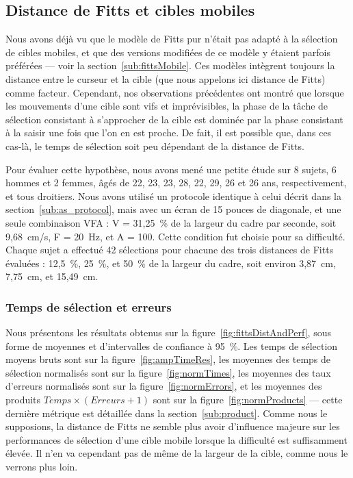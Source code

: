	\subsection{Distance de Fitts et cibles mobiles}
	\label{sub:fittsDistance}
	Nous avons déjà vu que le modèle de Fitts pur n'était pas adapté à la sélection de cibles mobiles, et que des versions modifiées de ce modèle y étaient parfois préférées --- voir la section~\ref{sub:fittsMobile}. Ces modèles intègrent toujours la distance entre le curseur et la cible (que nous appelons ici distance de Fitts) comme facteur. Cependant, nos observations précédentes ont montré que lorsque les mouvements d'une cible sont vifs et imprévisibles, la phase de la tâche de sélection consistant à s'approcher de la cible est dominée par la phase consistant à la saisir une fois que l'on en est proche. De fait, il est possible que, dans ces cas-là, le temps de sélection soit peu dépendant de la distance de Fitts.
	
	Pour évaluer cette hypothèse, nous avons mené une petite étude sur 8 sujets, 6 hommes et 2 femmes, âgés de 22, 23, 23, 28, 22, 29, 26 et 26 ans, respectivement, et tous droitiers. Nous avons utilisé un protocole identique à celui décrit dans la section~\ref{sub:as_protocol}, mais avec un écran de 15 pouces de diagonale, et une seule combinaison VFA : V = 31,25~\%{} de la largeur du cadre par seconde, soit 9,68~cm/s, F = 20~Hz, et A = 100\textdegree{}. Cette condition fut choisie pour sa difficulté. Chaque sujet a effectué 42 sélections pour chacune des trois distances de Fitts évaluées : 12,5~\%{}, 25~\%{}, et 50~\%{} de la largeur du cadre, soit environ 3,87~cm, 7,75~cm, et 15,49~cm.
	
	\subsubsection{Temps de sélection et erreurs}
	Nous présentons les résultats obtenus sur la figure~\ref{fig:fittsDistAndPerf}, sous forme de moyennes et d'intervalles de confiance à 95~\%{}. Les temps de sélection moyens bruts sont sur la figure~\ref{fig:ampTimeRes}, les moyennes des temps de sélection normalisés sont sur la figure~\ref{fig:normTimes}, les moyennes des taux d'erreurs normalisés sont sur la figure~\ref{fig:normErrors}, et les moyennes des produits $Temps\times(Erreurs+1)$ sont sur la figure~\ref{fig:normProducts} --- cette dernière métrique est détaillée dans la section~\ref{sub:product}. Comme nous le supposions, la distance de Fitts ne semble plus avoir d'influence majeure sur les performances de sélection d'une cible mobile lorsque la difficulté est suffisamment élevée. Il n'en va cependant pas de même de la largeur de la cible, comme nous le verrons plus loin.

